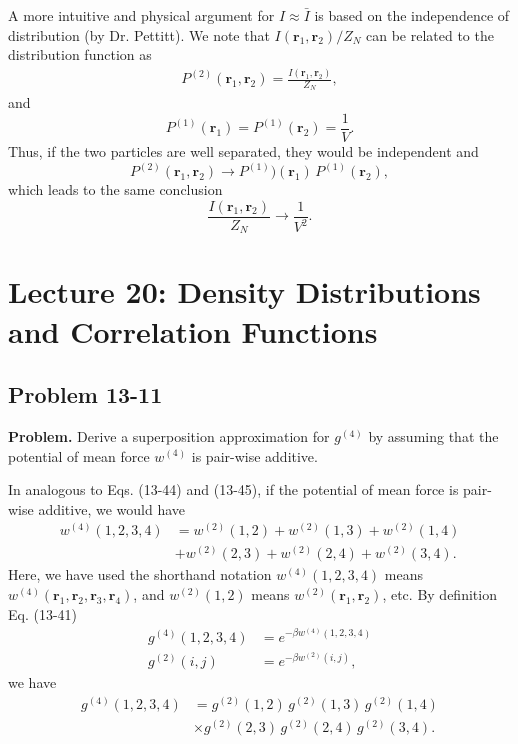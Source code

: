 \documentclass[twocolumn, 10pt]{article}
\numberwithin{equation}{section}
\newenvironment{problem}
{\par\medskip \color{problemblue}
  \textbf{Problem. }\ignorespaces}
{\medskip}
\newenvironment{solution}[1][\empty]
{\par\medskip\sffamily
  \textbf{\ifx\empty#1{Solution.}\relax\else{#1}\fi} \ignorespaces}
{\medskip}
\begin{document}
\begin{solution}
  A more intuitive and physical argument for $I \approx \bar I$
  is based on the independence of distribution
  (by Dr. Pettitt).
  We note that $I(\mathbf r_1, \mathbf r_2)/Z_N$ can be related to the distribution function
  as
  \begin{align*}
    P^{(2)}(\mathbf r_1, \mathbf r_2) = \frac{ I(\mathbf r_1, \mathbf r_2) } { Z_N },
  \end{align*}
  and
  $$
  P^{(1)}(\mathbf r_1) = P^{(1)}(\mathbf r_2) = \frac{1}{V}.
  $$
  Thus, if the two particles are well separated,
  they would be independent and
  $$
  P^{(2)}(\mathbf r_1, \mathbf r_2) \to P^{(1)})(\mathbf r_1) \, P^{(1)}(\mathbf r_2),
  $$
  which leads to the same conclusion
  $$
  \frac{I(\mathbf r_1, \mathbf r_2) }{Z_N} \to \frac{1}{V^2}.
  $$
\end{solution}



\section{Lecture 20: Density Distributions and Correlation Functions}

\subsection{Problem 13-11}

\begin{problem}
  Derive a superposition approximation for $g^{(4)}$
  by assuming that the potential of mean force $w^{(4)}$
  is pair-wise additive.
\end{problem}

\begin{solution}
  In analogous to Eqs. (13-44) and (13-45),
  if the potential of mean force is pair-wise additive,
  we would have
  \begin{align*}
    w^{(4)}(1,2,3,4)
    &=
    w^{(2)}(1,2)
    +w^{(2)}(1,3)
    +w^{(2)}(1,4)
    \\
    &+w^{(2)}(2,3)
    +w^{(2)}(2,4)
    +w^{(2)}(3,4)
    .
  \end{align*}
  Here, we have used the shorthand notation
  $w^{(4)}(1, 2, 3, 4)$
  means
  $w^{(4)}(\mathbf r_1, \mathbf r_2, \mathbf r_3, \mathbf r_4)$,
  and
  $w^{(2)}(1, 2)$
  means
  $w^{(2)}(\mathbf r_1, \mathbf r_2)$,
  etc.
  By definition Eq. (13-41)
  \begin{align*}
    g^{(4)}(1, 2, 3, 4)
    &=
    e^{-\beta w^{(4)}(1, 2, 3, 4)}
    \\
    g^{(2)}(i, j)
    &=
    e^{-\beta w^{(2)}(i, j)}
    ,
  \end{align*}
  we have
  \begin{align*}
    g^{(4)}(1,2,3,4)
    &=
    g^{(2)}(1,2) \,
    g^{(2)}(1,3) \,
    g^{(2)}(1,4)
    \\
    &\times
    g^{(2)}(2,3) \,
    g^{(2)}(2,4) \,
    g^{(2)}(3,4)
    .
  \end{align*}
\end{solution}
\end{document}
